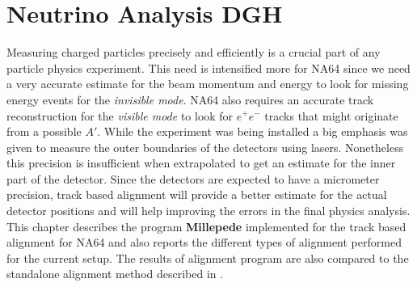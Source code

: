 
\chapter{Neutrino Analysis DGH}
\label{sec:align}
Measuring charged particles precisely and efficiently is a crucial part of any particle physics experiment. This need is intensified more for NA64 since we need a very accurate estimate for the beam momentum and energy to look for missing energy events for the \textit{invisible mode}. NA64 also requires an accurate track reconstruction for the \textit{visible mode} to look for $e^+ e^-$ tracks that might originate from a possible $A'$. While the experiment was being installed a big emphasis was given to measure the outer boundaries of the detectors using lasers. Nonetheless this precision is insufficient when extrapolated to get an estimate for the inner part of the detector. Since the detectors are expected to have a micrometer precision, track based alignment will provide a better estimate for the actual detector positions and will help improving the errors in the final physics analysis. This chapter describes the program \textbf{Millepede} implemented for the track based alignment for NA64 and also reports the different types of alignment performed for the current setup. The results of alignment program are also compared to the standalone alignment method described in \cite{nabeel:2018}.

